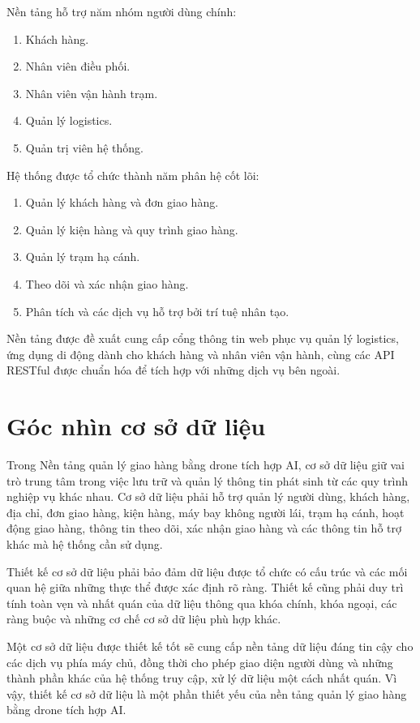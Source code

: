 Nền tảng hỗ trợ năm nhóm người dùng chính:

\begin{enumerate}
\item Khách hàng.
\item Nhân viên điều phối.
\item Nhân viên vận hành trạm.
\item Quản lý logistics.
\item Quản trị viên hệ thống.
\end{enumerate}

Hệ thống được tổ chức thành năm phân hệ cốt lõi:

\begin{enumerate}
\item Quản lý khách hàng và đơn giao hàng.
\item Quản lý kiện hàng và quy trình giao hàng.
\item Quản lý trạm hạ cánh.
\item Theo dõi và xác nhận giao hàng.
\item Phân tích và các dịch vụ hỗ trợ bởi trí tuệ nhân tạo.
\end{enumerate}

Nền tảng được đề xuất cung cấp cổng thông tin web phục vụ quản lý logistics, ứng dụng di động dành cho khách hàng và nhân viên vận hành, cùng các API RESTful được chuẩn hóa để tích hợp với những dịch vụ bên ngoài.

\section{Góc nhìn cơ sở dữ liệu}

\qquad Trong Nền tảng quản lý giao hàng bằng drone tích hợp AI, cơ sở dữ liệu giữ vai trò trung tâm trong việc lưu trữ và quản lý thông tin phát sinh từ các quy trình nghiệp vụ khác nhau. Cơ sở dữ liệu phải hỗ trợ quản lý người dùng, khách hàng, địa chỉ, đơn giao hàng, kiện hàng, máy bay không người lái, trạm hạ cánh, hoạt động giao hàng, thông tin theo dõi, xác nhận giao hàng và các thông tin hỗ trợ khác mà hệ thống cần sử dụng.

Thiết kế cơ sở dữ liệu phải bảo đảm dữ liệu được tổ chức có cấu trúc và các mối quan hệ giữa những thực thể được xác định rõ ràng. Thiết kế cũng phải duy trì tính toàn vẹn và nhất quán của dữ liệu thông qua khóa chính, khóa ngoại, các ràng buộc và những cơ chế cơ sở dữ liệu phù hợp khác.

Một cơ sở dữ liệu được thiết kế tốt sẽ cung cấp nền tảng dữ liệu đáng tin cậy cho các dịch vụ phía máy chủ, đồng thời cho phép giao diện người dùng và những thành phần khác của hệ thống truy cập, xử lý dữ liệu một cách nhất quán. Vì vậy, thiết kế cơ sở dữ liệu là một phần thiết yếu của nền tảng quản lý giao hàng bằng drone tích hợp AI.

